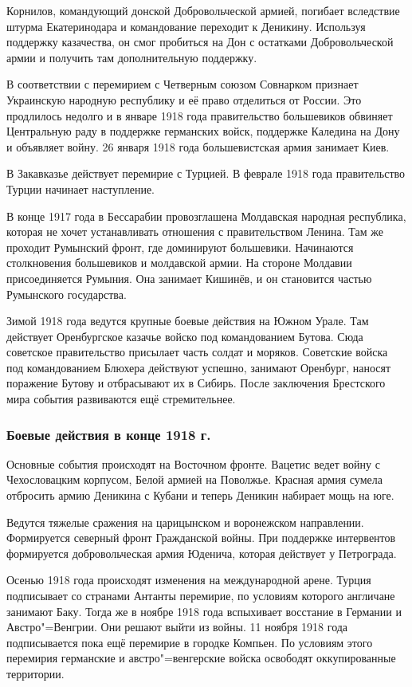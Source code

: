Корнилов, командующий донской Добровольческой армией, погибает вследствие штурма Екатеринодара и командование переходит к Деникину. Используя поддержку казачества, он смог пробиться на Дон с остатками Добровольческой армии и получить там дополнительную поддержку. 

В соответствии с перемирием с Четверным союзом Совнарком признает Украинскую народную республику и её право отделиться от России. Это продлилось недолго и в январе 1918 года правительство большевиков обвиняет Центральную раду в поддержке германских войск, поддержке Каледина на Дону и объявляет войну. 26 января 1918 года большевистская армия занимает Киев.

В Закавказье действует перемирие с Турцией. В феврале 1918 года правительство Турции начинает наступление.

В конце 1917 года в Бессарабии провозглашена Молдавская народная республика, которая не хочет устанавливать отношения с правительством Ленина. Там же проходит Румынский фронт, где доминируют большевики. Начинаются столкновения большевиков и молдавской армии. На стороне Молдавии присоединяется Румыния. Она занимает Кишинёв, и он становится частью Румынского государства.

Зимой 1918 года ведутся крупные боевые действия на Южном Урале. Там действует Оренбургское казачье войско под командованием Бутова. Сюда советское правительство присылает часть солдат и моряков. Советские войска под командованием Блюхера действуют успешно, занимают Оренбург, наносят поражение Бутову и отбрасывают их в Сибирь.
После заключения Брестского мира события развиваются ещё стремительнее.

\subsubsection{Боевые действия в конце 1918 г.}

Основные события происходят на Восточном фронте. Вацетис ведет войну с Чехословацким корпусом, Белой армией на Поволжье.
Красная армия сумела отбросить армию Деникина с Кубани и теперь Деникин набирает мощь на юге.

Ведутся тяжелые сражения на царицынском и воронежском направлении. 
Формируется северный фронт Гражданской войны. При поддержке интервентов формируется добровольческая армия Юденича, которая действует у Петрограда.

Осенью 1918 года происходят изменения на международной арене. Турция подписывает со странами Антанты перемирие, по условиям которого англичане занимают Баку. Тогда же в ноябре 1918 года вспыхивает восстание в Германии и Австро"=Венгрии. Они решают выйти из войны. 11 ноября 1918 года подписывается пока ещё перемирие в городке Компьен. По условиям этого перемирия германские и австро"=венгерские войска освободят оккупированные территории.


